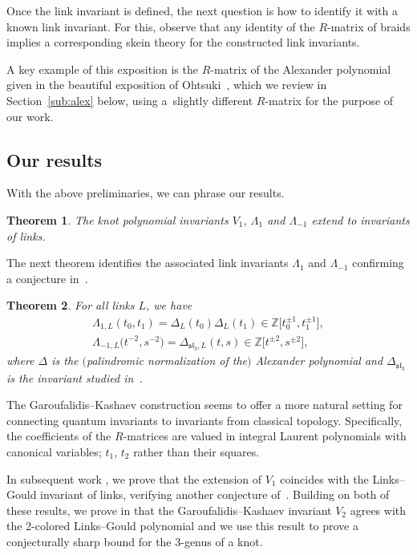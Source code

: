 \documentclass[pdftex]{sigma}
\numberwithin{equation}{section}
\newtheorem{Theorem}{Theorem}[section]
\theoremstyle{definition}
\begin{document}
Once the link invariant is defined, the next question is how to identify it
with a known link invariant. For this, observe that any identity of the $R$-matrix
of braids implies a corresponding skein theory for the constructed link invariants.

A key example of this exposition is the $R$-matrix of the Alexander polynomial
given in the beautiful exposition of Ohtsuki~\cite[Proposition~2.6]{Ohtsuki}, which we
review in Section~\ref{sub:alex} below, using a~slightly different $R$-matrix for
the purpose of our work.

\subsection{Our results}
\label{sub:results}

With the above preliminaries, we can phrase our results.

\begin{Theorem}\label{thm.1}
The knot polynomial invariants $V_1$, $\Lambda_1$ and $\Lambda_{-1}$ extend
to invariants of links.
\end{Theorem}

The next theorem identifies the associated link invariants
$\Lambda_1$ and $\Lambda_{-1}$ confirming a conjecture in~\cite{GK:multi}.

\begin{Theorem}\label{thm.2}
For all links $L$, we have
\begin{gather}%
\Lambda_{1,L}(t_0, t_1) = \Delta_L (t_0) \Delta_L(t_1)
\in \mathbb{Z}\bigl[t_0^{\pm 1},t_1^{\pm 1}\bigr],
\nonumber\\
\label{Lam1}
\Lambda_{-1,L}\bigl(t^{-2}, s^{-2}\bigr) = \Delta_{\mathfrak{sl}_3,L}(t,s)
\in \mathbb{Z}\bigl[t^{\pm2},s^{\pm2}\bigr],
\end{gather}
where $\Delta$ is the $($palindromic normalization of the$)$ Alexander polynomial and
$\Delta_{\mathfrak{sl}_3}$ is the invariant studied in~{\rm \cite{Harper}}.
\end{Theorem}

The Garoufalidis--Kashaev construction seems to offer a more natural setting for
connecting quantum invariants to invariants from classical topology. Specifically,
the coefficients of the $R$-matrices are valued in integral Laurent polynomials with
canonical variables; $t_1$, $t_2$ rather than their squares.

In subsequent work \cite{GHKKST}, we prove that the extension of $V_1$ coincides with the
Links--Gould invariant of links, verifying another conjecture of~\cite{GK:multi}. Building on both of these results, we prove in \cite{GHKKW} that the Garoufalidis--Kashaev invariant $V_2$ agrees with the 2-colored Links--Gould polynomial and we use this result to prove a conjecturally sharp bound for the 3-genus of a knot.
\end{document}
